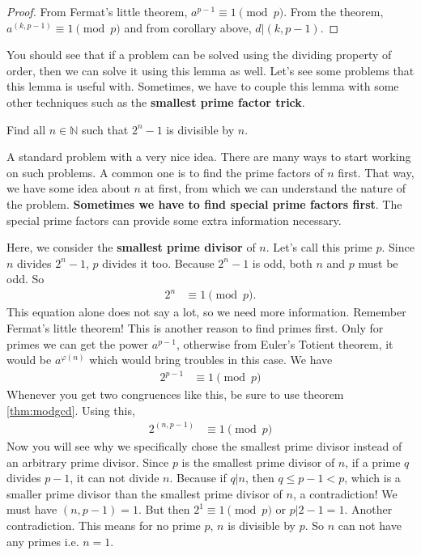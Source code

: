 \documentclass{subfile}
\begin{document}
		\begin{proof}
			From Fermat's little theorem, $a^{p-1}\equiv1\pmod p$. From the theorem, $a^{(k,p-1)}\equiv1\pmod p$ and from corollary above, $d|(k,p-1)$.
		\end{proof}
	You should see that if a problem can be solved using the dividing property of order, then we can solve it using this lemma as well. Let's see some problems that this lemma is useful with. Sometimes, we have to couple this lemma with some other techniques such as the \textbf{smallest prime factor trick}.

	\begin{problem}
		Find all $n\in\mathbb{N}$ such that $2^n-1$ is divisible by $n$.
	\end{problem}
	A standard problem with a very nice idea. There are many ways to start working on such problems. A common one is to find the prime factors of $n$ first. That way, we have some idea about $n$ at first, from which we can understand the nature of the problem. \textbf{Sometimes we have to find special prime factors first}. The special prime factors can provide some extra information necessary.
	\begin{solution}
		Here, we consider the \textbf{smallest prime divisor} of $n$. Let's call this prime $p$. Since $n$ divides $2^n-1$, $p$ divides it too. Because $2^n-1$ is odd, both $n$ and $p$ must be odd. So
		\begin{align*}
			2^n & \equiv1\pmod p.
		\end{align*}
		This equation alone does not say a lot, so we need more information. Remember Fermat's little theorem! This is another reason to find primes first. Only for primes we can get the power $a^{p-1}$, otherwise from Euler's Totient theorem, it would be $a^{\varphi(n)}$ which would bring troubles in this case. We have
		\begin{align*}
			2^{p-1} & \equiv1\pmod p
		\end{align*}
		Whenever you get two congruences like this, be sure to use theorem \eqref{thm:modgcd}. Using this,
		\begin{align*}
			2^{(n,p-1)} & \equiv1\pmod p
		\end{align*}
		Now you will see why we specifically chose the smallest prime divisor instead of an arbitrary prime divisor. Since $p$ is the smallest prime divisor of $n$, if a prime $q$ divides $p-1$, it can not divide $n$. Because if $q|n$, then $q\leq p-1<p$, which is a smaller prime divisor than the smallest prime divisor of $n$, a contradiction! We must have $(n,p-1)=1$. But then $2^1\equiv1\pmod p$ or $p|2-1=1$. Another contradiction. This means for no prime $p$, $n$ is divisible by $p$. So $n$ can  not have any primes i.e. $n=1$.
	\end{solution}
\end{document}
